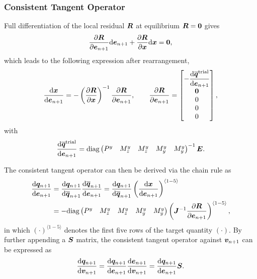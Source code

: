 \subsubsection{Consistent Tangent Operator}
Full differentiation of the local residual $\bm{R}$ at equilibrium $\bm{R}=\bm{0}$ gives
\begin{gather}
\dfrac{\partial{\bm{R}}}{\partial{\bm{e}_{n+1}}}\mathrm{d}\bm{e}_{n+1}+\dfrac{\partial{\bm{R}}}{\partial{\bm{x}}}\mathrm{d}\bm{x}=\bm{0},
\end{gather}
which leads to the following expression after rearrangement,
\begin{gather}
\dfrac{\mathrm{d}\bm{x}}{\mathrm{d}\bm{e}_{n+1}}=-\left(\dfrac{\partial{\bm{R}}}{\partial{\bm{x}}}\right)^{-1}\dfrac{\partial{\bm{R}}}{\partial{\bm{e}_{n+1}}},\qquad
\dfrac{\partial{\bm{R}}}{\partial{\bm{e}_{n+1}}}=\begin{bmatrix}
-\dfrac{\mathrm{d}\bm{\overline{q}}^\text{trial}}{\mathrm{d}\bm{e}_{n+1}}\\\bm{0}\\0\\0\\0
\end{bmatrix},
\end{gather}
with
\begin{gather}
\dfrac{\mathrm{d}\bm{\overline{q}}^\text{trial}}{\mathrm{d}\bm{e}_{n+1}}=\text{diag}\left(\begin{matrix}
P^y&M^y_z&M^y_z&M^y_y&M^y_y
\end{matrix}\right)^{-1}\bm{E}.
\end{gather}

The consistent tangent operator can then be derived via the chain rule as
\begin{gather}\label{eq:nm_consistent_tangent}
\begin{split}
\dfrac{\mathrm{d}\bm{q}_{n+1}}{\mathrm{d}\bm{e}_{n+1}}&=\dfrac{\mathrm{d}\bm{q}_{n+1}}{\mathrm{d}\bm{\overline{q}}_{n+1}}\dfrac{\mathrm{d}\bm{\overline{q}}_{n+1}}{\mathrm{d}\bm{e}_{n+1}}=\dfrac{\mathrm{d}\bm{q}_{n+1}}{\mathrm{d}\bm{\overline{q}}_{n+1}}\left(\dfrac{\mathrm{d}\bm{x}}{\mathrm{d}\bm{e}_{n+1}}\right)^{\langle1-5\rangle}\\
&=-\text{diag}\left(\begin{matrix}
P^y&M^y_z&M^y_z&M^y_y&M^y_y
\end{matrix}\right)\left(\bm{J}^{-1}\dfrac{\partial{\bm{R}}}{\partial{\bm{e}_{n+1}}}\right)^{\langle1-5\rangle},
\end{split}
\end{gather}
in which $\left(\cdot\right)^{\langle1-5\rangle}$ denotes the first five rows of the target quantity $\left(\cdot\right)$.
By further appending a $\bm{S}$ matrix, the consistent tangent operator against $\bm{v}_{n+1}$ can be expressed as
\begin{gather}
\dfrac{\mathrm{d}\bm{q}_{n+1}}{\mathrm{d}\bm{v}_{n+1}}=\dfrac{\mathrm{d}\bm{q}_{n+1}}{\mathrm{d}\bm{e}_{n+1}}\dfrac{\mathrm{d}\bm{e}_{n+1}}{\mathrm{d}\bm{v}_{n+1}}=\dfrac{\mathrm{d}\bm{q}_{n+1}}{\mathrm{d}\bm{e}_{n+1}}\bm{S}.
\end{gather}
